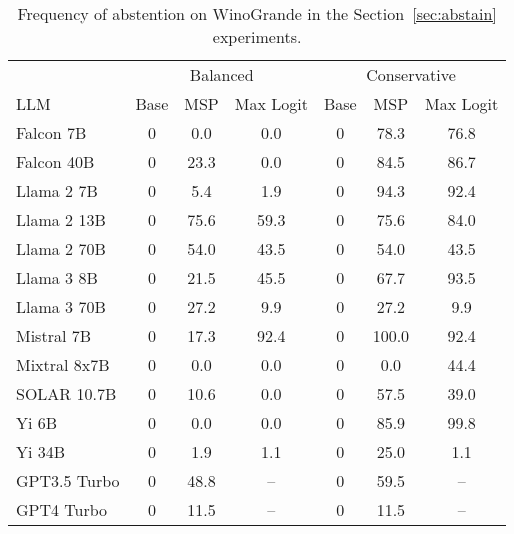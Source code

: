 \begin{table*}[h]
\centering
\caption{Frequency of abstention on WinoGrande in the Section~\ref{sec:abstain} experiments.}
\label{tab:winogrande_pct_abstained}
\begin{tabular}{lcccccc}
\toprule
& \multicolumn{3}{c}{Balanced} & \multicolumn{3}{c}{Conservative} \\ 
LLM & Base & MSP & Max Logit & Base & MSP & Max Logit \\ 
\cmidrule(lr){1-1}\cmidrule(lr){2-4}\cmidrule(lr){5-7} 
Falcon 7B & 0 & 0.0 & 0.0 & 0 & 78.3 & 76.8\\
Falcon 40B & 0 & 23.3 & 0.0 & 0 & 84.5 & 86.7\\
Llama 2 7B & 0 & 5.4 & 1.9 & 0 & 94.3 & 92.4\\
Llama 2 13B & 0 & 75.6 & 59.3 & 0 & 75.6 & 84.0\\
Llama 2 70B & 0 & 54.0 & 43.5 & 0 & 54.0 & 43.5\\
Llama 3 8B & 0 & 21.5 & 45.5 & 0 & 67.7 & 93.5\\
Llama 3 70B & 0 & 27.2 & 9.9 & 0 & 27.2 & 9.9\\
Mistral 7B & 0 & 17.3 & 92.4 & 0 & 100.0 & 92.4\\
Mixtral 8x7B & 0 & 0.0 & 0.0 & 0 & 0.0 & 44.4\\
SOLAR 10.7B & 0 & 10.6 & 0.0 & 0 & 57.5 & 39.0\\
Yi 6B & 0 & 0.0 & 0.0 & 0 & 85.9 & 99.8\\
Yi 34B & 0 & 1.9 & 1.1 & 0 & 25.0 & 1.1\\
GPT3.5 Turbo & 0 & 48.8 & -- & 0 & 59.5 & --\\
GPT4 Turbo & 0 & 11.5 & -- & 0 & 11.5 & --\\
\bottomrule
\end{tabular}
\end{table*}
